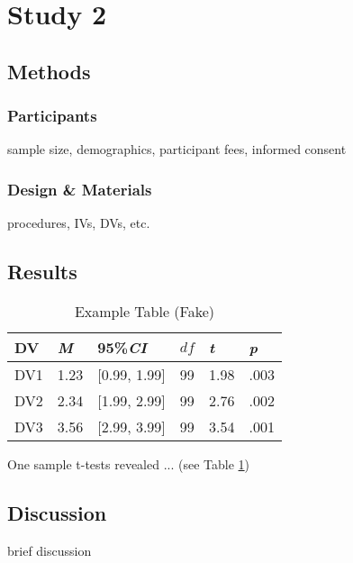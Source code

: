 \section{Study 2}

\subsection{Methods}

\subsubsection{Participants}

sample size, demographics, participant fees, informed consent

\subsubsection{Design \& Materials}

procedures, IVs, DVs, etc.

\subsection{Results}

\begin{table}[ht]
\centering
\fontsize{10pt}{12pt}\selectfont
\caption{Example Table (Fake)}
\begin{tabular}{llllll}
    \toprule
    DV& \textit{M}& 95\%\textit{CI} &   $df$&\textit{t}&\textit{p} \\
    \midrule
    DV1 & 1.23 & [0.99, 1.99] & 99 & 1.98 & .003 \\
    DV2 & 2.34 & [1.99, 2.99] & 99 & 2.76 & .002 \\
    DV3 & 3.56 & [2.99, 3.99] & 99 & 3.54 & .001 \\
    \bottomrule
\end{tabular}
\label{tab: Study 2 Example Table}
\end{table}

One sample t-tests revealed ... (see Table \ref{tab: Study 2 Example Table})

\subsection{Discussion}

brief discussion